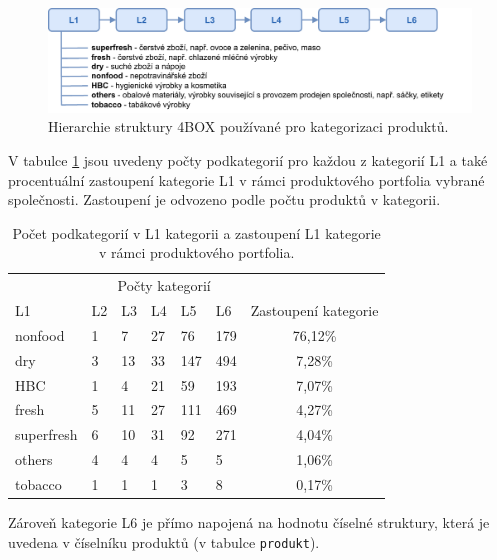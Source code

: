 \begin{figure}[hbtp!]
    \centering
    \includegraphics[width=\textwidth]{obrazky/4box.pdf}
    \caption{Hierarchie struktury 4BOX používané pro kategorizaci produktů.}
    \label{obr:d:4box}
\end{figure}

V tabulce \ref*{tab:d:4Bzast} jsou uvedeny počty podkategorií pro každou z kategorií L1 a také procentuální zastoupení kategorie L1 v rámci produktového portfolia vybrané společnosti. Zastoupení je odvozeno podle počtu produktů v kategorii.

\begin{table}[]
    \begin{center}
    \caption{Počet podkategorií v L1 kategorii a zastoupení L1 kategorie v rámci produktového portfolia.}
    \label{tab:d:4Bzast}
    \begin{tabular}{p{3cm}  p{1cm} p{1cm} p{1cm} p{1cm} p{1cm}  c}
        & \multicolumn{5}{c}{Počty kategorií} &                      \\
        L1         & L2    & L3   & L4   & L5    & L6    & Zastoupení kategorie \\
        \hline
        nonfood    & 1     & 7    & 27   & 76    & 179   & 76,12\%              \\
        dry   & 3     & 13   & 33   & 147   & 494   & 7,28\%               \\
        HBC        & 1     & 4    & 21   & 59    & 193   & 7,07\%               \\
        fresh & 5     & 11   & 27   & 111   & 469   & 4,27\%               \\
        superfresh & 6     & 10   & 31   & 92    & 271   & 4,04\%               \\
        others     & 4     & 4    & 4    & 5     & 5     & 1,06\%               \\
        tobacco    & 1     & 1    & 1    & 3     & 8     & 0,17\%            
    \end{tabular}
    \end{center}
    \end{table}

Zároveň kategorie L6 je přímo napojená na hodnotu číselné struktury, která je uvedena v číselníku produktů (v tabulce \texttt{produkt}).


